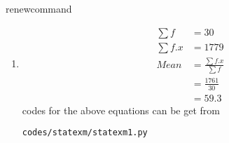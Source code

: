 renewcommand{\theequation}{\theenumi}
\begin{enumerate}[label=\arabic*.,ref=\thesubsection.\theenumi]
\item
\begin{align}
\sum{f} &= 30
\\
\sum{f.x} &= 1779
\\
Mean &= \frac{\sum{f.x}}{\sum{f}}
\\&= \frac{1761}{30}
\\&= 59.3
\end{align}
codes for the above equations can be get from
\begin{lstlisting}
codes/statexm/statexm1.py
\end{lstlisting}
\end{enumerate}